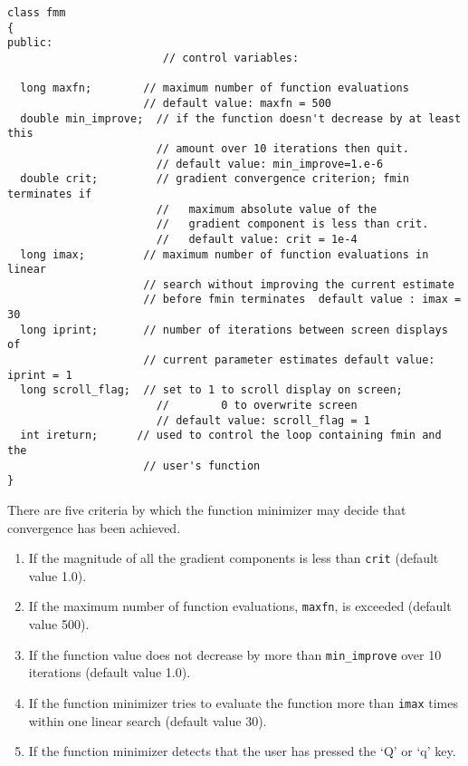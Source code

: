 \documentclass{admbmanual}
\begin{document}
\begin{lstlisting}
class fmm
{
public:
                        // control variables:

  long maxfn;        // maximum number of function evaluations
                     // default value: maxfn = 500
  double min_improve;  // if the function doesn't decrease by at least this
                       // amount over 10 iterations then quit.
                       // default value: min_improve=1.e-6
  double crit;         // gradient convergence criterion; fmin terminates if
                       //   maximum absolute value of the
                       //   gradient component is less than crit.
                       //   default value: crit = 1e-4
  long imax;         // maximum number of function evaluations in linear
                     // search without improving the current estimate
                     // before fmin terminates  default value : imax = 30
  long iprint;       // number of iterations between screen displays of
                     // current parameter estimates default value: iprint = 1
  long scroll_flag;  // set to 1 to scroll display on screen;
                       //        0 to overwrite screen
                       // default value: scroll_flag = 1
  int ireturn;      // used to control the loop containing fmin and the
                     // user's function
}
\end{lstlisting}

There are five criteria by which the function minimizer may decide that
convergence has been achieved.
\begin{enumerate}
  \item If the magnitude of all the gradient components is less than
  \texttt{crit} (default value 1.0).

  \item If the maximum number of function evaluations, \texttt{maxfn}, is
  exceeded (default value 500).

  \item If the function value does not decrease by more than
  \texttt{min\_improve} over 10 iterations (default value 1.0).

  \item If the function minimizer tries to evaluate the function more than
  \texttt{imax} times within one linear search (default value 30).

  \item If the function minimizer detects that the user has pressed the `Q' or
  `q' key.
\end{enumerate}
\end{document}
